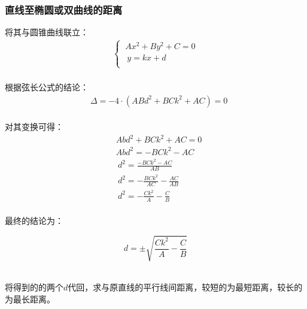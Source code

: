 \documentclass[UTF8]{ctexart}
\begin{document}
\subsubsection{直线至椭圆或双曲线的距离}
    将其与圆锥曲线联立：
    \setcounter{equation}{0}
    \begin{align}
        \begin{cases}
            ~Ax^2+By^2+C=0\\[1mm]
            ~~y=kx+d\\[1mm]
        \end{cases}
    \end{align}\\
    根据弦长公式的结论：
    \begin{align}
        &\Delta=-4\cdot\left(ABd^2+BCk^2+AC\right)=0
    \end{align}\\
    对其变换可得：
    \begin{align}
        &Abd^2+BCk^2+AC=0\\[3mm]
        &Abd^2=-BCk^2-AC\\[3mm]
        &~d^2=\frac{-BCk^2-AC}{AB}\\[3mm]
        &~d^2=-\frac{BCk^2}{AC}-\frac{AC}{AB}\\[3mm]
        &~d^2=-\frac{Ck^2}{A}-\frac{C}{B}
    \end{align}\\
    最终的结论为：
    \begin{large}
        \begin{equation*}
            d=\pm\sqrt{\frac{Ck^2}{A}-\frac{C}{B}}
        \end{equation*}
    \end{large}\\
    将得到的的两个$d$代回，求与原直线的平行线间距离，较短的为最短距离，较长的为最长距离。

\newpage
\end{document}
